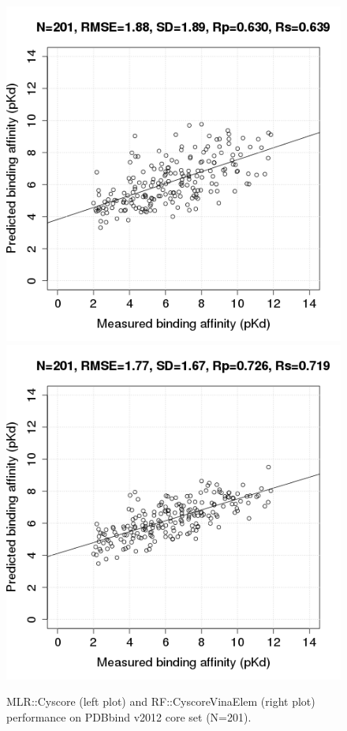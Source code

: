\documentclass[10pt,conference,compsocconf]{IEEEtran}
\begin{document}
\begin{figure}
\includegraphics[width=1.37\linewidth,natwidth=480,natheight=480]{../rfcyscore/x4/mlr/trn-247-tst-201-yp.png}
\endminipage
{}
\includegraphics[width=1.37\linewidth,natwidth=480,natheight=480]{../rfcyscore/x46/rf/trn-2280-tst-201-yp.png}
\endminipage
\caption{MLR::Cyscore (left plot) and RF::CyscoreVinaElem (right plot) performance on PDBbind v2012 core set (N=201).}
\label{fig:tst201}
\end{figure}
\end{document}
